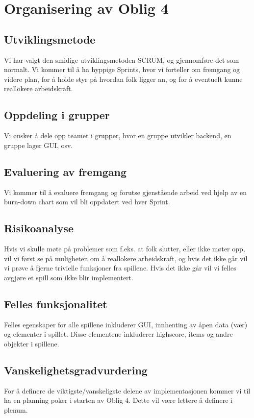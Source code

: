 \documentclass[12pt]{report}
\begin{document}

\section*{Organisering av Oblig 4}

\subsection*{Utviklingsmetode}

Vi har valgt den smidige utviklingsmetoden SCRUM, og gjennomføre det som normalt. 
Vi kommer til å ha hyppige Sprints, hvor vi forteller om fremgang og videre plan, 
for å holde styr på hvordan folk ligger an, og for å eventuelt kunne reallokere arbeidskraft.

\subsection*{Oppdeling i grupper}

Vi ønsker å dele opp teamet i grupper, hvor en gruppe utvikler backend, en gruppe lager GUI, osv.

\subsection*{Evaluering av fremgang}

Vi kommer til å evaluere fremgang og forutse gjenstående arbeid 
ved hjelp av en burn-down chart som vil bli oppdatert ved hver Sprint.

\subsection*{Risikoanalyse}

Hvis vi skulle møte på problemer som f.eks. at folk slutter, eller ikke møter opp, 
vil vi først se på muligheten om å reallokere arbeidskraft, 
og hvis det ikke går vil vi prøve å fjerne trivielle funksjoner fra spillene. 
Hvis det ikke går vil vi felles avgjøre et spill som ikke blir implementert.

\subsection*{Felles funksjonalitet}

Felles egenskaper for alle spillene inkluderer GUI, 
innhenting av åpen data (vær) og elementer i spillet.
Disse elementene inkluderer highscore, items og andre objekter i spillene.

\subsection*{Vanskelighetsgradvurdering}

For å definere de viktigste/vanskeligste delene av implementasjonen
kommer vi til ha en planning poker i starten av Oblig 4.
Dette vil være lettere å definere i plenum.
\end{document}
